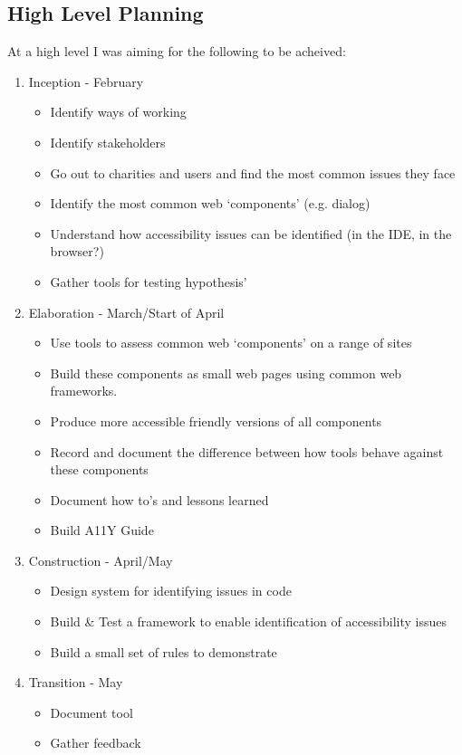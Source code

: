 \subsection{High Level Planning}
At a high level I was aiming for the following to be acheived:
\begin{enumerate}
  \item {Inception - February}
    \begin{itemize}
      \item Identify ways of working
      \item Identify stakeholders
      \item Go out to charities and users and find the most common issues they face
      \item Identify the most common web ‘components’ (e.g. dialog)
      \item Understand how accessibility issues can be identified (in the IDE,
       in the browser?)
      \item Gather tools for testing hypothesis’
    \end{itemize}
  \item {Elaboration - March/Start of April}
    \begin {itemize}
      \item Use tools to assess common web ‘components’ on a range of sites
      \item Build these components as small web pages using common web frameworks.
      \item Produce more accessible friendly versions of all components
      \item Record and document the difference between how tools behave
      against these components
      \item Document how to’s and lessons learned
      \item Build A11Y Guide
    \end {itemize}
  \item {Construction - April/May}
    \begin{itemize}
      \item Design system for identifying issues in code
      \item Build \& Test a framework to enable identification of accessibility
      issues
      \item Build a small set of rules to demonstrate
    \end{itemize}
  \item {Transition - May}
     \begin{itemize}
        \item Document tool
        \item Gather feedback
     \end{itemize}
\end {enumerate}

